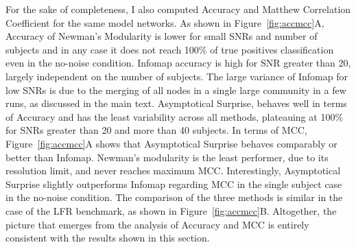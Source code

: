 For the sake of completeness, I also computed Accuracy and Matthew Correlation Coefficient for the same model networks.
As shown in Figure~\ref{fig:accmcc}A, Accuracy of Newman's Modularity is lower for small SNRs and number of subjects and in any case it does not reach 100\% of true positives classification even in the no-noise condition.
Infomap accuracy is high for SNR greater than 20, largely independent on the number of subjects.
The large variance of Infomap for low SNRs is due to the merging of all nodes in a single large community in a few runs, as discussed in the main text.
Asymptotical Surprise, behaves well in terms of Accuracy and has the least variability across all methods, plateauing at 100\% for SNRs greater than 20 and more than 40 subjects.
In terms of MCC, Figure~\ref{fig:accmcc}A shows that Asymptotical Surprise behaves comparably or better than Infomap.
Newman's modularity is the least performer, due to its resolution limit, and never reaches maximum MCC.
Interestingly, Asymptotical Surprise slightly outperforms Infomap regarding MCC in the single subject case in the no-noise condition.
The comparison of the three methods is similar in the case of the LFR benchmark, as shown in Figure~\ref{fig:accmcc}B.
Altogether, the picture that emerges from the analysis of Accuracy and MCC is entirely consistent with the results shown in this section.



